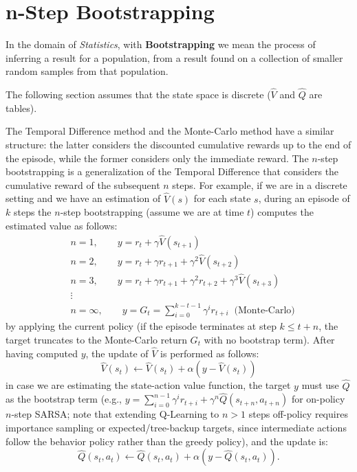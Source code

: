 \documentclass[10pt, a4paper]{report}
\begin{document}
\section{n-Step Bootstrapping}
In the domain of \textit{Statistics}, with \textbf{Bootstrapping} we mean the process of inferring a result for a population, from a result found on a collection of smaller random samples from that population.
\begin{boxobservation}{}{}
    The following section assumes that the state space is discrete ($\hat V$ and $\hat Q$ are tables).
\end{boxobservation}
The Temporal Difference method and the Monte-Carlo method have a similar structure: the latter considers the discounted cumulative rewards up to the end of the episode, while the former considers only the immediate reward. The $n$-step bootstrapping is a generalization of the Temporal Difference that considers the cumulative reward of the subsequent $n$ steps.
For example, if we are in a discrete setting and we have an estimation of $\hat V(s)$ for each state $s$, during an episode of $k$ steps the $n$-step bootstrapping (assume we are at time $t$) computes the estimated value as follows:
\begin{align}
    &n=1,\qquad y=r_t+\gamma \hat V(s_{t+1}) \\
    &n=2,\qquad y=r_t+\gamma r_{t+1}+\gamma^2 \hat V(s_{t+2}) \\
    &n=3,\qquad y=r_t+\gamma r_{t+1}+\gamma^2 r_{t+2}+\gamma^3\hat V(s_{t+3}) \\
    &\vdots \nonumber \\
    &n=\infty,\qquad y=G_t=\sum_{i=0}^{k-t-1}\gamma^i r_{t+i} \ \text{ (Monte-Carlo)}
\end{align}
by applying the current policy (if the episode terminates at step $k \le t+n$, the target truncates to the Monte-Carlo return $G_t$ with no bootstrap term). After having computed $y$, the update of $\hat V$ is performed as follows:\begin{equation}
    \hat V(s_t)\leftarrow\hat V(s_t)+\alpha\left(y-\hat V(s_t)\right)
\end{equation}
in case we are estimating the state-action value function, the target $y$ must use $\hat{Q}$ as the bootstrap term (e.g., $y = \sum_{i=0}^{n-1}\gamma^i r_{t+i} + \gamma^n \hat{Q}(s_{t+n}, a_{t+n})$ for on-policy $n$-step SARSA; note that extending Q-Learning to $n > 1$ steps off-policy requires importance sampling or expected/tree-backup targets, since intermediate actions follow the behavior policy rather than the greedy policy), and the update is:\begin{equation}
    \hat{Q}(s_t, a_t) \leftarrow \hat{Q}(s_t, a_t) + \alpha \left( y - \hat{Q}(s_t, a_t) \right).
\end{equation}
\end{document}
